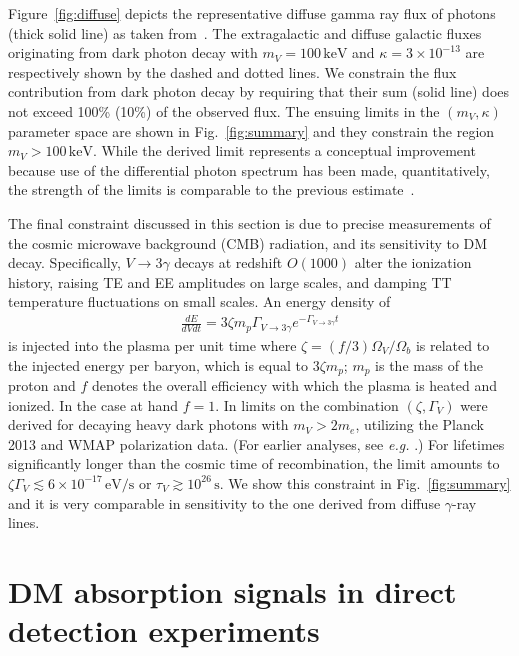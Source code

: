 \documentclass[prd,reprint,nofootinbib,notitlepage,aps,tightenlines,preprintnumbers,amsmath,amssymb,showpacs,superscriptaddress]{revtex4-1}
\renewcommand{\sec}{\ensuremath{\mathrm{s}}}
\newcommand{\eV}{\ensuremath{\mathrm{eV}}}
\newcommand{\keV}{\ensuremath{\mathrm{keV}}}
\begin{document}
Figure~\ref{fig:diffuse} depicts the representative diffuse gamma ray
flux of photons (thick solid line) as taken
from~\cite{Yuksel:2007dr}. The extragalactic and diffuse galactic
fluxes originating from dark photon decay with $m_V = 100\,\keV$ and
$\kappa = 3\times 10^{-13}$ are respectively shown by the dashed and
dotted lines.  We constrain the flux contribution from dark photon
decay by requiring that their sum (solid line) does not exceed 100\%
(10\%) of the observed flux. The ensuing limits in the $(m_V,\kappa)$
parameter space are shown in Fig.~\ref{fig:summary} and they constrain
the region $m_V > 100\,\keV $. While the derived limit represents a
conceptual improvement because use of the differential photon spectrum
has been made, quantitatively, the strength of the limits is
comparable to the previous estimate~\cite{Redondo:2008ec}.


The final constraint discussed in this section is due to precise measurements of the cosmic
microwave background (CMB) radiation, and its sensitivity to DM decay. 
Specifically, $V\to 3\gamma$ decays at
redshift $O(1000)$ alter the ionization history, raising TE and EE
amplitudes on large scales, and damping TT temperature fluctuations on
small scales. An energy density of
%
\begin{align}
  \frac{dE}{dV dt} =  3 \zeta m_p \Gamma_{V\to 3 \gamma} e^{-\Gamma_{V\to 3\gamma}t} 
\end{align}
%
is injected into the plasma per unit time where
$\zeta = (f/3) \Omega_V/\Omega_b$ is related to the injected energy
per baryon, which is equal to $3\zeta m_p$; $m_p$ is the mass of the proton and $f$
denotes the overall efficiency with which the plasma is heated and
ionized. In the case at hand $f=1$. In \cite{Fradette:2014sza} limits
on the combination $(\zeta,\Gamma_V)$ were derived for decaying heavy
dark photons with $m_V>2m_e$, utilizing the Planck 2013 and WMAP
polarization data. (For earlier analyses, see {\em e.g.}
\cite{Chen:2003gz,Cline:2013fm}.)  For lifetimes significantly longer
than the cosmic time of recombination, the limit amounts to
$\zeta \Gamma_V\lesssim 6\times 10^{-17}\,\eV/\sec$ or
$\tau_V \gtrsim 10^{26}\,\sec$. We show this constraint in
Fig.~\ref{fig:summary} and it is very comparable in sensitivity to the
one derived from diffuse $\gamma$-ray lines.



\section{DM absorption signals in direct detection experiments}
\label{sec:dm-absorpt-sign}
\end{document}
